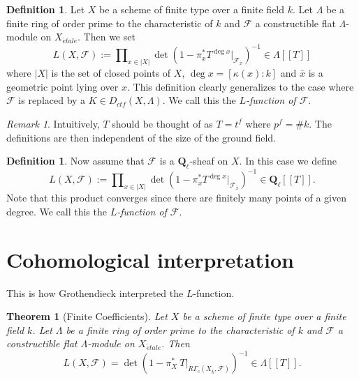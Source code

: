 \documentclass{stacks-project}
\theoremstyle{plain}
\newtheorem{theorem}[subsection]{Theorem}
\theoremstyle{definition}
\newtheorem{definition}[subsection]{Definition}
\theoremstyle{remark}
\newtheorem{remark}[subsection]{Remark}
\numberwithin{equation}{subsection}
\def\etale{{\acute{e}tale}}
\begin{document}
\begin{definition}
\label{definition-L-function-finite-ring}
Let $X$ be a scheme of finite type over a finite field $k$. Let $\Lambda$ be a
finite ring of order prime to the characteristic of $k$ and $\mathcal{F}$ a
constructible flat $\Lambda$-module on $X_\etale$. Then we set
$$
L(X, \mathcal{F}) :=
\prod\nolimits_{x\in |X|}
\det(1 - \pi_x^*T^{\deg x} |_{\mathcal{F}_{\bar x}})^{-1} \in \Lambda [[ T ]]
$$
where $|X|$ is the set of closed points of $X$, $\deg x = [\kappa(x): k]$ and
$\bar x$ is a geometric point lying over $x$. This definition clearly
generalizes to the case where $\mathcal{F}$ is replaced by a
$K \in D_{ctf}(X, \Lambda)$. We call this the {\it $L$-function of
$\mathcal{F}$}.
\end{definition}

\begin{remark}
\label{remark-T}
Intuitively, $T$ should be thought of as $T = t^f$ where $p^f = \# k$. The
definitions are then independent of the size of the ground field.
\end{remark}

\begin{definition}
\label{definition-L-function-l-adic}
Now assume that $\mathcal{F}$ is a $\mathbf{Q}_\ell$-sheaf on $X$.
In this case we define
$$
L(X, \mathcal{F}) :=
\prod\nolimits_{x \in |X|}
\det(1 - \pi_x^*T^{\deg x} |_{\mathcal{F}_{\bar x}})^{-1}
\in \mathbf{Q}_\ell[[T]].
$$
Note that this product converges since there are finitely many points of a
given degree. We call this the {\it $L$-function of
$\mathcal{F}$}.
\end{definition}




\section{Cohomological interpretation}
\label{section-L-cohomological}

\noindent
This is how Grothendieck interpreted the $L$-function.

\begin{theorem}[Finite Coefficients]
\label{theorem-A}
Let $X$ be a scheme of finite type over a finite field $k$. Let $\Lambda$ be a
finite ring of order prime to the characteristic of $k$ and $\mathcal{F}$ a
constructible flat $\Lambda$-module on $X_\etale$. Then
$$
L(X, \mathcal{F}) =
\det(1 - \pi_X^*\ T |_{R\Gamma_c(X_{\bar k}, \mathcal{F})})^{-1}
\in \Lambda[[T]].
$$
\end{theorem}
\end{document}
